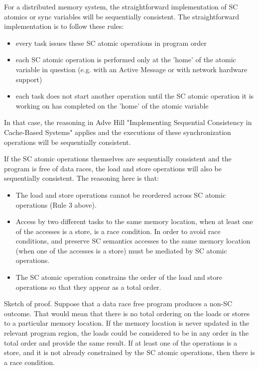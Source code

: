 For a distributed memory system, the straightforward implementation of SC
atomics or sync variables will be sequentially consistent. The straightforward
implementation is to follow these rules:

\begin{itemize}

 \item every task issues these SC atomic operations in program order

 \item each SC atomic operation is performed only at the 'home' of the atomic
 variable in question (e.g. with an Active Message or with network hardware
 support)

 \item each task does not start another operation until the SC atomic operation
 it is working on has completed on the 'home' of the atomic variable

\end{itemize}

In that case, the reasoning in Adve Hill "Implementing Sequential Consistency
in Cache-Based Systems" applies and the executions of these synchronization
operations will be sequentially consistent.

If the SC atomic operations themselves are sequentially consistent and the
program is free of data races, the load and store operations will also be
sequentially consistent. The reasoning here is that:

\begin{itemize}

 \item The load and store operations cannot be reordered across SC atomic
 operations (Rule 3 above).

 \item Access by two different tasks to the same memory location, when at least
 one of the accesses is a store, is a race condition. In order to avoid race
 conditions, and preserve SC semantics accesses to the same memory location
 (when one of the accesses is a store) must be mediated by SC atomic
 operations.

 \item The SC atomic operation constrains the order of the load and store
 operations so that they appear as a total order.
\end{itemize}

Sketch of proof. Suppose that a data race free program produces a non-SC
outcome. That would mean that there is no total ordering on the loads or stores
to a particular memory location. If the memory location is never updated in the
relevant program region, the loads could be considered to be in any order in
the total order and provide the same result. If at least one of the operations
is a store, and it is not already constrained by the SC atomic operations, then
there is a race condition.

